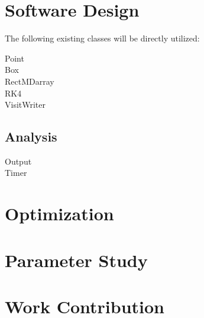 \documentclass{article}
\begin{document}
\section{Software Design}
The following existing classes will be directly utilized:
\begin{description}
\item[Point]
\item[Box]
\item[RectMDarray]
\item[RK4]
\item[VisitWriter]
\item[]
\end{description}

\subsection{Analysis}
\begin{description}
\item[Output]
\item[Timer]
\end{description} 
	
\section{Optimization}
\section{Parameter Study} 
\section{Work Contribution} 
\end{document}
